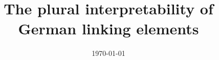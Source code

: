 

\smartqed

\journalname{}
\title{The plural interpretability of German linking elements}
\author{}
\institute{}
\date{\today}

\newcommand{\TheDOI}{REDACTED}
\newcommand{\TheUniversity}{REDACTED}

